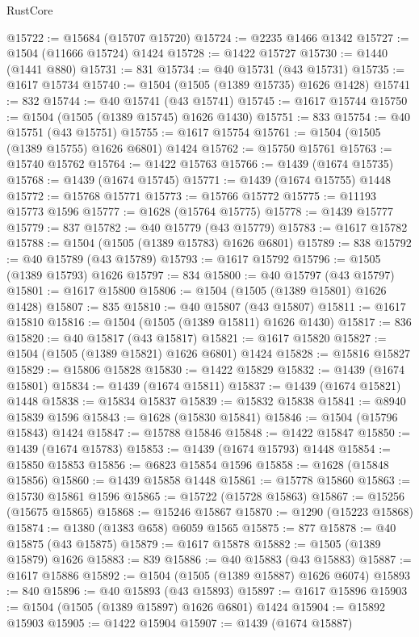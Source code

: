 \begin{lexlean}{RustCore}
\begin{coremodule}
@15722 := @15684 (@15707 @15720)
@15724 := @2235 @1466 @1342
@15727 := @1504 (@11666 @15724) @1424
@15728 := @1422 @15727
@15730 := @1440 (@1441 @880)
@15731 := 831
@15734 := @40 @15731 (@43 @15731)
@15735 := @1617 @15734
@15740 := @1504 (@1505 (@1389 @15735) @1626 @1428)
@15741 := 832
@15744 := @40 @15741 (@43 @15741)
@15745 := @1617 @15744
@15750 := @1504 (@1505 (@1389 @15745) @1626 @1430)
@15751 := 833
@15754 := @40 @15751 (@43 @15751)
@15755 := @1617 @15754
@15761 := @1504 (@1505 (@1389 @15755) @1626 @6801) @1424
@15762 := @15750 @15761
@15763 := @15740 @15762
@15764 := @1422 @15763
@15766 := @1439 (@1674 @15735)
@15768 := @1439 (@1674 @15745)
@15771 := @1439 (@1674 @15755) @1448
@15772 := @15768 @15771
@15773 := @15766 @15772
@15775 := @11193 @15773 @1596
@15777 := @1628 (@15764 @15775)
@15778 := @1439 @15777
@15779 := 837
@15782 := @40 @15779 (@43 @15779)
@15783 := @1617 @15782
@15788 := @1504 (@1505 (@1389 @15783) @1626 @6801)
@15789 := 838
@15792 := @40 @15789 (@43 @15789)
@15793 := @1617 @15792
@15796 := @1505 (@1389 @15793) @1626
@15797 := 834
@15800 := @40 @15797 (@43 @15797)
@15801 := @1617 @15800
@15806 := @1504 (@1505 (@1389 @15801) @1626 @1428)
@15807 := 835
@15810 := @40 @15807 (@43 @15807)
@15811 := @1617 @15810
@15816 := @1504 (@1505 (@1389 @15811) @1626 @1430)
@15817 := 836
@15820 := @40 @15817 (@43 @15817)
@15821 := @1617 @15820
@15827 := @1504 (@1505 (@1389 @15821) @1626 @6801) @1424
@15828 := @15816 @15827
@15829 := @15806 @15828
@15830 := @1422 @15829
@15832 := @1439 (@1674 @15801)
@15834 := @1439 (@1674 @15811)
@15837 := @1439 (@1674 @15821) @1448
@15838 := @15834 @15837
@15839 := @15832 @15838
@15841 := @8940 @15839 @1596
@15843 := @1628 (@15830 @15841)
@15846 := @1504 (@15796 @15843) @1424
@15847 := @15788 @15846
@15848 := @1422 @15847
@15850 := @1439 (@1674 @15783)
@15853 := @1439 (@1674 @15793) @1448
@15854 := @15850 @15853
@15856 := @6823 @15854 @1596
@15858 := @1628 (@15848 @15856)
@15860 := @1439 @15858 @1448
@15861 := @15778 @15860
@15863 := @15730 @15861 @1596
@15865 := @15722 (@15728 @15863)
@15867 := @15256 (@15675 @15865)
@15868 := @15246 @15867
@15870 := @1290 (@15223 @15868)
@15874 := @1380 (@1383 @658) @6059 @1565
@15875 := 877
@15878 := @40 @15875 (@43 @15875)
@15879 := @1617 @15878
@15882 := @1505 (@1389 @15879) @1626
@15883 := 839
@15886 := @40 @15883 (@43 @15883)
@15887 := @1617 @15886
@15892 := @1504 (@1505 (@1389 @15887) @1626 @6074)
@15893 := 840
@15896 := @40 @15893 (@43 @15893)
@15897 := @1617 @15896
@15903 := @1504 (@1505 (@1389 @15897) @1626 @6801) @1424
@15904 := @15892 @15903
@15905 := @1422 @15904
@15907 := @1439 (@1674 @15887)

\end{coremodule}
\end{lexlean}
